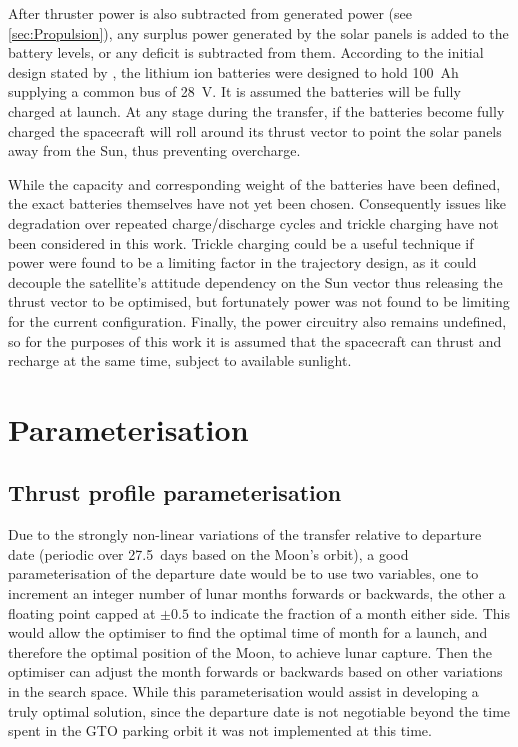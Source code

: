 After thruster power is also subtracted from generated power (see \autoref{sec:Propulsion}), any surplus power generated by the solar panels is added to the battery levels, or any deficit is subtracted from them. According to the initial design stated by \textcite{Falke2004}, the lithium ion batteries were designed to hold 100~Ah supplying a common bus of 28~V. It is assumed the batteries will be fully charged at launch. At any stage during the transfer, if the batteries become fully charged the spacecraft will roll around its thrust vector to point the solar panels away from the Sun, thus preventing overcharge.

While the capacity and corresponding weight of the batteries have been defined, the exact batteries themselves have not yet been chosen. Consequently issues like degradation over repeated charge/discharge cycles and trickle charging have not been considered in this work. Trickle charging could be a useful technique if power were found to be a limiting factor in the trajectory design, as it could decouple the satellite's attitude dependency on the Sun vector thus releasing the thrust vector to be optimised, but fortunately power was not found to be limiting for the current configuration. Finally, the power circuitry also remains undefined, so for the purposes of this work it is assumed that the spacecraft can thrust and recharge at the same time, subject to available sunlight.



\section{Parameterisation} \label{sec:Parameterisation}




\subsection{Thrust profile parameterisation} \label{sub:Thrust-parameterisation}

Due to the strongly non-linear variations of the transfer relative to departure date (periodic over 27.5~days based on the Moon's orbit), a good parameterisation of the departure date would be to use two variables, one to increment an integer number of lunar months forwards or backwards, the other a floating point capped at $\pm 0.5$ to indicate the fraction of a month either side. This would allow the optimiser to find the optimal time of month for a launch, and therefore the optimal position of the Moon, to achieve lunar capture. Then the optimiser can adjust the month forwards or backwards based on other variations in the search space. While this parameterisation would assist in developing a truly optimal solution, since the departure date is not negotiable beyond the time spent in the GTO parking orbit it was not implemented at this time.

